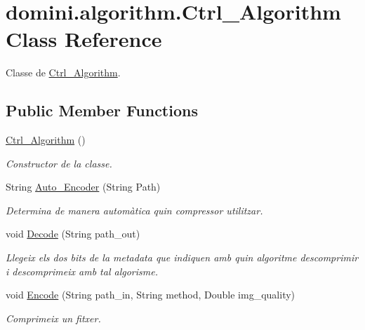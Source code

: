 \hypertarget{classdomini_1_1algorithm_1_1Ctrl__Algorithm}{}\section{domini.\+algorithm.\+Ctrl\+\_\+\+Algorithm Class Reference}
\label{classdomini_1_1algorithm_1_1Ctrl__Algorithm}


Classe de \hyperlink{classdomini_1_1algorithm_1_1Ctrl__Algorithm}{Ctrl\+\_\+\+Algorithm}.  


\subsection*{Public Member Functions}
\begin{DoxyCompactItemize}
\item 
\hyperlink{classdomini_1_1algorithm_1_1Ctrl__Algorithm_aa625781819b57512a3e42df15a3b2ffb}{Ctrl\+\_\+\+Algorithm} ()
\begin{DoxyCompactList}\small\item\em Constructor de la classe. \end{DoxyCompactList}\item 
String \hyperlink{classdomini_1_1algorithm_1_1Ctrl__Algorithm_a6f7a706e07d4e6f8c1ea293d06e17318}{Auto\+\_\+\+Encoder} (String Path)
\begin{DoxyCompactList}\small\item\em Determina de manera automàtica quin compressor utilitzar. \end{DoxyCompactList}\item 
void \hyperlink{classdomini_1_1algorithm_1_1Ctrl__Algorithm_a6c3c10937741891cfeae31043b64a975}{Decode} (String path\+\_\+out)
\begin{DoxyCompactList}\small\item\em Llegeix els dos bits de la metadata que indiquen amb quin algoritme descomprimir i descomprimeix amb tal algorisme. \end{DoxyCompactList}\item 
void \hyperlink{classdomini_1_1algorithm_1_1Ctrl__Algorithm_ac03e09b1fd22f0857bf766fc692efc33}{Encode} (String path\+\_\+in, String method, Double img\+\_\+quality)
\begin{DoxyCompactList}\small\item\em Comprimeix un fitxer. \end{DoxyCompactList}\end{DoxyCompactItemize}


